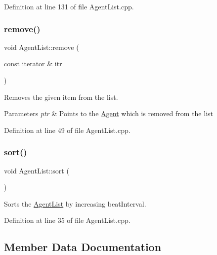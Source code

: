 Definition at line 131 of file Agent\+List.\+cpp.

\mbox{\label{class_agent_list_af44adc7160efd1062dd9c631f2349aa7}} 
\subsubsection{\texorpdfstring{remove()}{remove()}}
{\footnotesize\ttfamily void Agent\+List\+::remove (\begin{DoxyParamCaption}\item[{const iterator \&}]{itr }\end{DoxyParamCaption})}

Removes the given item from the list. 
\begin{DoxyParams}{Parameters}
{\em ptr} & Points to the \hyperlink{class_agent}{Agent} which is removed from the list \\
\hline
\end{DoxyParams}


Definition at line 49 of file Agent\+List.\+cpp.

\mbox{\label{class_agent_list_a70c1d9daa4e814f6ebfd45f84f9ce73f}} 
\subsubsection{\texorpdfstring{sort()}{sort()}}
{\footnotesize\ttfamily void Agent\+List\+::sort (\begin{DoxyParamCaption}{ }\end{DoxyParamCaption})}

Sorts the \hyperlink{class_agent_list}{Agent\+List} by increasing beat\+Interval. 

Definition at line 35 of file Agent\+List.\+cpp.



\subsection{Member Data Documentation}
\mbox{\label{class_agent_list_a8da51527cedc40ee03bec9d9b4db0a2d}} 
